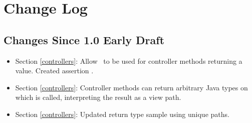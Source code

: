 \chapter{Change Log}

\section{Changes Since 1.0 Early Draft}

\begin{itemize}
\item Section \ref{controllers}: Allow \View\ to be used for controller methods returning a 
 value. Created assertion .
\item Section \ref{controllers}: Controller methods can return arbitrary Java types on which  is called, interpreting the result as a view path.
\item Section \ref{controllers}: Updated return type sample using unique paths.
\end{itemize}
